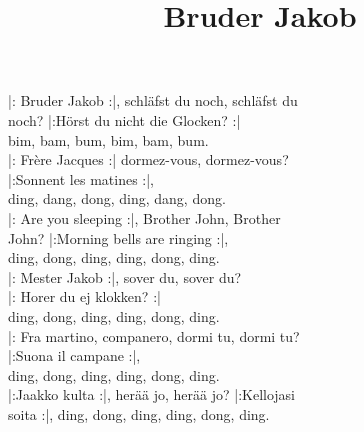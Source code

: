 \title{Bruder Jakob} 

|: Bruder Jakob :|, schläfst du noch, schläfst du \\ 
noch? |:Hörst du nicht die Glocken? :| \\ 
bim, bam, bum, bim, bam, bum. \\ 
|: Frère Jacques :| dormez-vous, dormez-vous? \\ 
|:Sonnent les matines :|, \\ 
ding, dang, dong, ding, dang, dong. \\ 
|: Are you sleeping :|, Brother John, Brother \\ 
John? |:Morning bells are ringing :|, \\ 
ding, dong, ding, ding, dong, ding. \\ 
|: Mester Jakob :|, sover du, sover du? \\ 
|: Horer du ej klokken? :| \\ 
ding, dong, ding, ding, dong, ding. \\ 
|: Fra martino, companero, dormi tu, dormi tu? \\ 
|:Suona il campane :|, \\ 
ding, dong, ding, ding, dong, ding. \\ 
|:Jaakko kulta :|, herää jo, herää jo? |:Kellojasi \\ 
soita :|, ding, dong, ding, ding, dong, ding.

